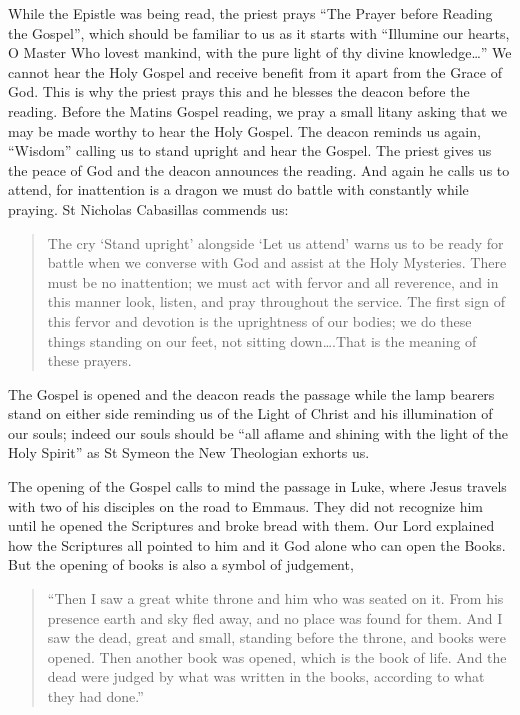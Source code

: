 \documentclass[
]{article}
\begin{document}
While the Epistle was being read, the priest prays ``The Prayer before
Reading the Gospel'', which should be familiar to us as it starts with
``Illumine our hearts, O Master Who lovest mankind, with the pure light
of thy divine knowledge\ldots{}'' We cannot hear the Holy Gospel and
receive benefit from it apart from the Grace of God. This is why the
priest prays this and he blesses the deacon before the reading. Before
the Matins Gospel reading, we pray a small litany asking that we may be
made worthy to hear the Holy Gospel. The deacon reminds us again,
``Wisdom'' calling us to stand upright and hear the Gospel. The priest
gives us the peace of God and the deacon announces the reading. And
again he calls us to attend, for inattention is a dragon we must do
battle with constantly while praying. St Nicholas Cabasillas commends
us:

\begin{quote}
The cry `Stand upright' alongside `Let us attend' warns us to be ready
for battle when we converse with God and assist at the Holy Mysteries.
There must be no inattention; we must act with fervor and all reverence,
and in this manner look, listen, and pray throughout the service. The
first sign of this fervor and devotion is the uprightness of our bodies;
we do these things standing on our feet, not sitting down\ldots.That is
the meaning of these prayers.
\end{quote}

The Gospel is opened and the deacon reads the passage while the lamp
bearers stand on either side reminding us of the Light of Christ and his
illumination of our souls; indeed our souls should be ``all aflame and
shining with the light of the Holy Spirit'' as St Symeon the New
Theologian exhorts us.

The opening of the Gospel calls to mind the passage in Luke, where Jesus
travels with two of his disciples on the road to Emmaus. They did not
recognize him until he opened the Scriptures and broke bread with them.
Our Lord explained how the Scriptures all pointed to him and it God
alone who can open the Books. But the opening of books is also a symbol
of judgement,

\begin{quote}
``Then I saw a great white throne and him who was seated on it. From his
presence earth and sky fled away, and no place was found for them. And I
saw the dead, great and small, standing before the throne, and books
were opened. Then another book was opened, which is the book of life.
And the dead were judged by what was written in the books, according to
what they had done.''
\end{quote}
\end{document}
